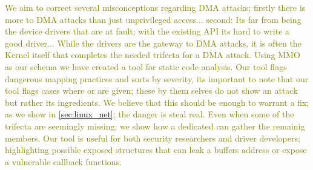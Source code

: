 \textcolor{olive}{We aim to correct several misconceptions regarding DMA attacks; firstly there is more to DMA attacks than just unprivileged access... second: Its far from being the device drivers that are at fault; with the existing API its hard to write a good driver... While the drivers are the gateway to DMA attacks, it is often the Kernel itself that completes the needed trifecta for a DMA attack. Using MMO as our schema we have created a tool for static code analysis. Our tool flags dangerous mapping practices and sorts by severity, its important to note that our tool flags cases where \oportunity or \means are given; these by them selves do not show an attack but rather its ingredients. We believe that this should be enough to warrant a fix; as we show in \ref{sec:linux_net}; the danger is steal real. Even when some of the trifecta are seemingly missing; we show how a dedicated can gather the remainig members. Our tool is useful for both security researchers and driver developers; highlighting possible exposed structures that can leak a buffers address or expose a vulnerable callback functions.}
